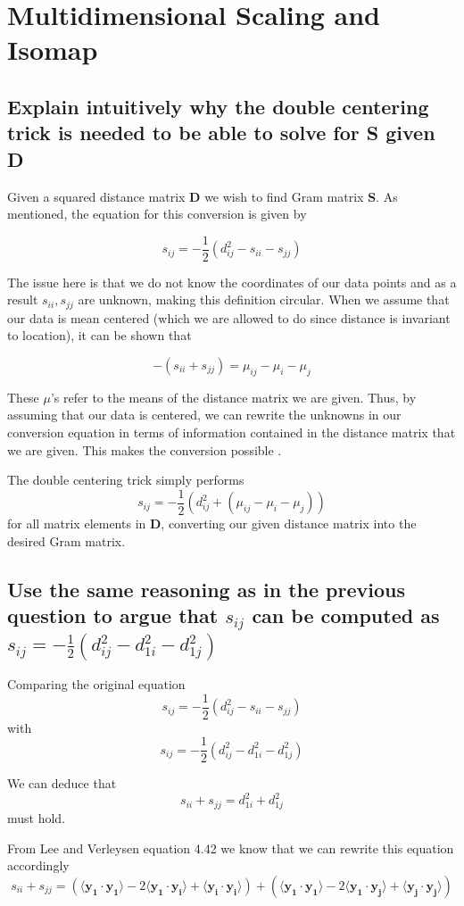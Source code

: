 \documentclass[11pt,a4paper,landscape]{article}
\begin{document}
\section{Multidimensional Scaling and Isomap}

\subsection{Explain intuitively why the double centering trick is needed to be able to solve for S given D}

Given a squared distance matrix \textbf{D} we wish to find Gram matrix \textbf{S}. As mentioned, the equation for this conversion is given by

$$ s_{ij} = -\frac{1}{2}(d^{2}_{ij} - s_{ii} - s_{jj})$$

The issue here is that we do not know the coordinates of our data points and as a result $s_{ii}, s_{jj}$ are unknown, making this definition circular. When we assume that our data is mean centered (which we are allowed to do since distance is invariant to location), it can be shown that

$$ -(s_{ii} + s_{jj}) = \mu_{ij} - \mu_{i} - \mu_{j} $$

These $\mu$'s refer to the means of the distance matrix we are given. Thus, by assuming that our data is centered, we can rewrite the unknowns in our conversion equation in terms of information contained in the distance matrix that we are given. This makes the conversion possible \cite{book}.

The double centering trick simply performs $$ s_{ij} = -\frac{1}{2}(d^{2}_{ij} +( \mu_{ij} - \mu_{i} - \mu_{j}))$$ for all matrix elements in \textbf{D}, converting our given distance matrix into the desired Gram matrix.


\subsection{Use the same reasoning as in the previous question to argue that $s_{ij}$ can be computed as $s_{ij} = -\frac{1}{2}(d_{ij}^{2} - d_{1i}^{2} - d_{1j}^{2})$}

Comparing the original equation
$$ s_{ij} = -\frac{1}{2}(d^{2}_{ij} - s_{ii} - s_{jj})$$
with
$$s_{ij} = -\frac{1}{2}(d_{ij}^{2} - d_{1i}^{2} - d_{1j}^{2})$$

We can deduce that
$$s_{ii} + s_{jj} = d_{1i}^{2} + d_{1j}^{2}$$
must hold.\newline

From Lee and Verleysen \cite{book} equation 4.42 we know that we can rewrite this equation accordingly
$$ s_{ii} + s_{jj} = (\langle \mathbf{y_{1}} \cdot \mathbf{y_{1}} \rangle - 2\langle \mathbf{y_{1}} \cdot \mathbf{y_{i}} \rangle + \langle \mathbf{y_{i}} \cdot \mathbf{y_{i}} \rangle) + (\langle \mathbf{y_{1}} \cdot \mathbf{y_{1}} \rangle - 2\langle \mathbf{y_{1}} \cdot \mathbf{y_{j}} \rangle + \langle \mathbf{y_{j}} \cdot \mathbf{y_{j}} \rangle)$$
\end{document}
